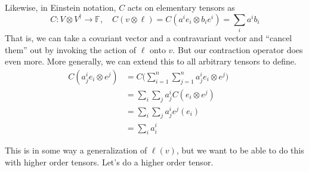 \begin{example}
		Likewise, in Einstein notation, $C$ acts on elementary tensors as 
		\begin{equation}
			C: V \otimes V^\dagger \to \mathbb{F}, \quad C(v \otimes \ell) = C(a^i e_i \otimes b_i e^i) = \sum_i a^i b_i
		\end{equation} 
		That is, we can take a covariant vector and a contravariant vector and ``cancel them'' out by invoking the action of $\ell$ onto $v$. But our contraction operator does even more. More generally, we can extend this to all arbitrary tensors to define. 
		\begin{align}
			C(a^i_j e_i \otimes e^j) & = C \bigg( \sum_{i=1}^n \sum_{j=1}^n a^i_j e_i \otimes e^j \bigg) \\ 
															 & = \sum_i \sum_j a^i_j C(e_i \otimes e^j) && \tag{linearity of $C$} \\ 
															 & = \sum_i \sum_j a^i_j e^j (e_i) \\ 
															 & = \sum_i a^i_i
		\end{align}
	\end{example}

	This is in some way a generalization of $\ell(v)$, but we want to be able to do this with higher order tensors. Let's do a higher order tensor. 

